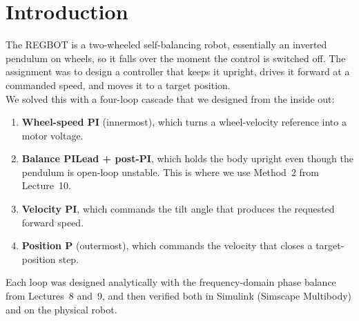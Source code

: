 \section{Introduction}
\label{sec:introduction}

The REGBOT is a two-wheeled self-balancing robot, essentially an inverted pendulum on wheels, so it falls over the moment the control is switched off. The assignment was to design a controller that keeps it upright, drives it forward at a commanded speed, and moves it to a target position.\\
\noindent We solved this with a four-loop cascade that we designed from the inside out:
\begin{enumerate}[leftmargin=*,nosep]
    \item \textbf{Wheel-speed PI} (innermost), which turns a wheel-velocity reference into a motor voltage.
    \item \textbf{Balance PILead + post-PI}, which holds the body upright even though the pendulum is open-loop unstable. This is where we use Method~2 from Lecture~10.
    \item \textbf{Velocity PI}, which commands the tilt angle that produces the requested forward speed.
    \item \textbf{Position P} (outermost), which commands the velocity that closes a target-position step.
\end{enumerate}

\noindent Each loop was designed analytically with the frequency-domain phase balance from Lectures~8 and~9, and then verified both in Simulink (Simscape Multibody) and on the physical robot.
